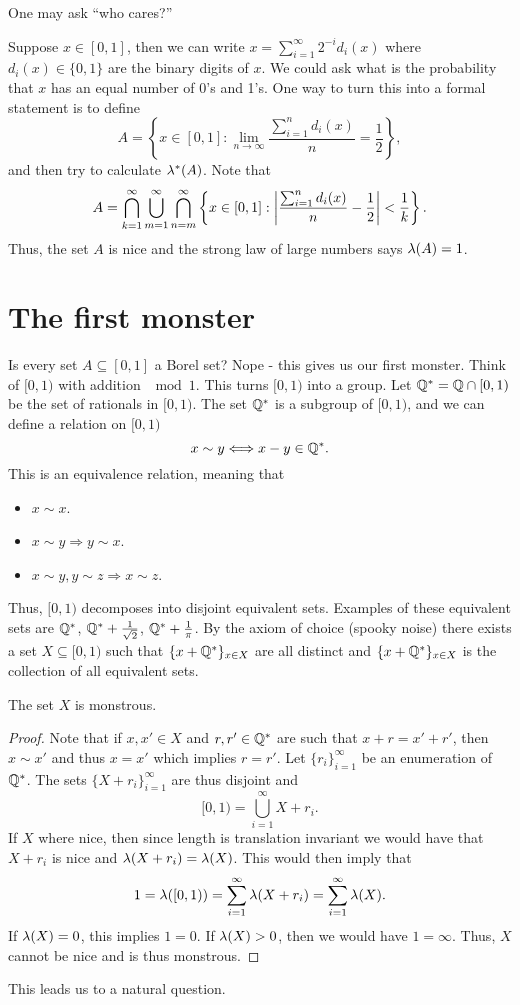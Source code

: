One may ask ``who cares?''
\begin{ex}
    Suppose $x \in [0,1]$, then we can write $x = \sum_{i=1}^\infty 2^{-i}d_i(x)$ where $d_i(x) \in \{0,1\}$ are the binary digits of $x$. We could ask what is the probability that $x$ has an equal number of 0's and 1's. One way to turn this into a formal statement is to define 
    \[A = \left\{x \in [0,1] : \lim_{n \to \infty} \frac{\sum_{i=1}^n d_i(x)}{n} = \frac{1}{2}\right\}, \]
    and then try to calculate $\lambda^*(A)$. Note that 
    \[A = \bigcap_{k=1}^{\infty} \bigcup_{m=1}^\infty \bigcap_{n=m}^\infty \left\{x \in [0,1] : {\left\lvert\frac{\sum_{i=1}^n d_i(x)}{n}-\frac{1}{2}\right\rvert} < \frac{1}{k} \right\}. \]
    Thus, the set $A$ is nice and the strong law of large numbers says $\lambda(A) = 1$.
\end{ex}
\section{The first monster}
Is every set $A \subseteq [0,1]$ a Borel set? Nope - this gives us our first monster. Think of $[0,1)$ with addition $\mod 1$. This turns $[0,1)$ into a group. Let ${\mathbb{Q}}^* = {\mathbb{Q}} \cap [0,1)$ be the set of rationals in $[0,1)$. The set ${\mathbb{Q}}^*$ is a subgroup of $[0,1)$, and we can define a relation on $[0,1)$
\[x \sim y \Longleftrightarrow x-y \in {\mathbb{Q}}^*. \]
This is an equivalence relation, meaning that
\begin{itemize}
    \item $x \sim x$.
    \item $x \sim y \Longrightarrow y \sim x$.
    \item $x \sim y, y \sim z \Longrightarrow x \sim z$.
\end{itemize}
Thus, $[0,1)$ decomposes into disjoint equivalent sets. Examples of these equivalent sets are ${\mathbb{Q}}^*$, ${\mathbb{Q}}^*+\frac{1}{\sqrt{2}}$, ${\mathbb{Q}}^*+\frac{1}{\pi}$. By the axiom of choice (spooky noise) there exists a set $X \subseteq [0,1)$ such that $\{x + {\mathbb{Q}}^*\}_{x \in X}$ are all distinct and $\{x + {\mathbb{Q}}^*\}_{x \in X}$ is the collection of all equivalent sets. 

\begin{claim}
    The set $X$ is monstrous.
\end{claim}
\begin{proof}
    Note that if $x,x'\in X$ and $r,r' \in {\mathbb{Q}}^*$ are such that $x+r=x'+r'$, then $x \sim x'$ and thus $x =x'$ which implies $r=r'$. Let $\{r_i\}_{i=1}^\infty$ be an enumeration of ${\mathbb{Q}}^*$. The sets $\{X+r_i\}_{i=1}^\infty$ are thus disjoint and 
    \[[0,1) = \bigcup_{i=1}^\infty X+r_i. \]
    If $X$ where nice, then since length is translation invariant we would have that $X+r_i$ is nice and $\lambda(X+r_i) = \lambda(X)$. This would then imply that
    \[1=\lambda([0,1)) = \sum_{i=1}^\infty \lambda(X+r_i) = \sum_{i=1}^\infty \lambda(X). \]
    If $\lambda(X) = 0$, this implies $1=0$. If $\lambda(X) > 0$, then we would have $1=\infty$. Thus, $X$ cannot be nice and is thus monstrous.
\end{proof}
This leads us to a natural question.

